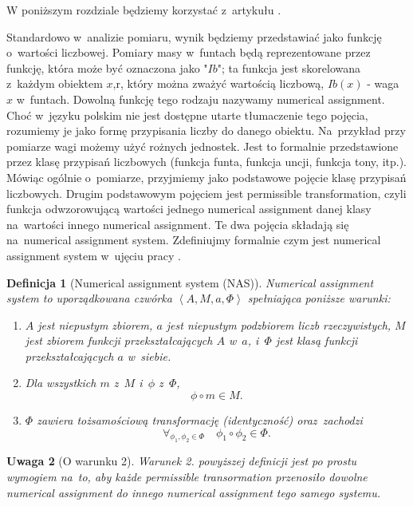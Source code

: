 \documentclass[12pt,a4paper]{report}
\newtheorem{definition}{Definicja}[chapter]
\newtheorem{remark}[definition]{Uwaga}
\newcommand{\tuple}[1]{\left\langle {#1} \right\rangle}
\begin{document}
W poniższym rozdziale będziemy korzystać z~artykułu {\citep{adams1965theory}}.

Standardowo w~analizie pomiaru, wynik będziemy przedstawiać jako funkcję o~wartości liczbowej. Pomiary masy w~funtach będą reprezentowane przez funkcję, która może być oznaczona jako "$Ib$";  ta funkcja jest skorelowana z~każdym obiektem $x$,r, który można zważyć wartością liczbową, $Ib(x)$ - waga $x$ w~funtach. Dowolną funkcję tego rodzaju nazywamy numerical assignment. Choć w~języku polskim nie jest dostępne utarte tłumaczenie tego pojęcia, rozumiemy je jako formę przypisania liczby do danego obiektu. Na~przykład przy pomiarze wagi możemy użyć rożnych jednostek. Jest to formalnie przedstawione  przez klasę przypisań liczbowych (funkcja funta, funkcja uncji, funkcja tony, itp.). Mówiąc ogólnie o~pomiarze, przyjmiemy jako podstawowe pojęcie klasę przypisań liczbowych. Drugim podstawowym pojęciem jest permissible transformation, czyli funkcja odwzorowującą wartości jednego numerical assignment danej klasy na~wartości innego numerical assignment. Te dwa pojęcia składają się na~numerical assignment system. Zdefiniujmy formalnie czym jest numerical assignment system w~ujęciu pracy {\citep{adams1965theory}}.
\begin{definition}[Numerical assignment system (NAS){\citep[Def. 1]{adams1965theory}}] 
Numerical assignment system to uporządkowana czwórka $\tuple{A, M, a, \Phi}$ spełniająca poniższe warunki:
\begin{enumerate}
\item
$A$ jest niepustym zbiorem, $a$ jest niepustym podzbiorem liczb rzeczywistych, $M$ jest zbiorem funkcji przekształcających $A$ w~$a$, i~$\Phi$ jest klasą funkcji przekształcających $a$ w~siebie.  
\item
Dla wszystkich $m$ z~$M$ i~$\phi$ z~$\Phi$,
$$
 \phi \circ m \in M.
$$ 
\item
$\Phi$ zawiera tożsamościową transformację (identyczność) oraz~zachodzi
$$
\forall_{\phi_{1}, \phi_{2} \in \Phi} \quad \phi_{1} \circ \phi_{2} \in \Phi.
$$

\end{enumerate}

\end{definition}

\begin{remark}[O warunku 2]
Warunek 2. powyższej definicji jest po prostu wymogiem na~to, aby każde permissible transormation przenosiło dowolne numerical assignment do innego numerical assignment tego samego systemu.
\end{remark}
\end{document}
